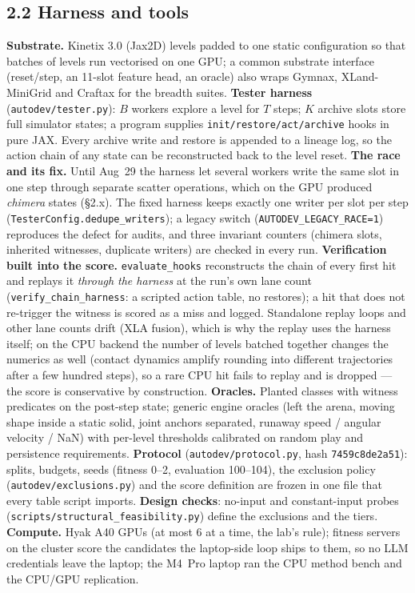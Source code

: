 \subsection*{2.2 Harness and tools}
\textbf{Substrate.} Kinetix 3.0 (Jax2D) levels padded to one static configuration so that batches of levels run vectorised on one GPU; a
common substrate interface (reset/step, an 11-slot feature head, an oracle) also wraps Gymnax, XLand-MiniGrid and Craftax for the breadth
suites. \textbf{Tester harness} (\texttt{autodev/tester.py}): $B$ workers explore a level for $T$ steps; $K$ archive slots store full simulator
states; a program supplies \texttt{init/restore/act/archive} hooks in pure JAX. Every archive write and restore is appended to a lineage log, so
the action chain of any state can be reconstructed back to the level reset. \textbf{The race and its fix.} Until Aug~29 the harness let several
workers write the same slot in one step through separate scatter operations, which on the GPU produced \emph{chimera} states (\S2.x). The fixed
harness keeps exactly one writer per slot per step (\texttt{TesterConfig.dedupe\_writers}); a legacy switch (\texttt{AUTODEV\_LEGACY\_RACE=1})
reproduces the defect for audits, and three invariant counters (chimera slots, inherited witnesses, duplicate writers) are checked in every run.
\textbf{Verification built into the score.} \texttt{evaluate\_hooks} reconstructs the chain of every first hit and replays it \emph{through the
harness} at the run's own lane count (\texttt{verify\_chain\_harness}: a scripted action table, no restores); a hit that does not re-trigger the
witness is scored as a miss and logged. Standalone replay loops and other lane counts drift (XLA fusion), which is why the replay uses the harness
itself; on the CPU backend the number of levels batched together changes the numerics as well (contact dynamics amplify rounding into different trajectories after a few hundred steps), so a rare CPU hit fails to replay and is dropped --- the score is conservative by construction. \textbf{Oracles.} Planted classes with witness predicates on the post-step state; generic engine oracles (left the arena, moving shape inside
a static solid, joint anchors separated, runaway speed / angular velocity / NaN) with per-level thresholds calibrated on random play and
persistence requirements. \textbf{Protocol} (\texttt{autodev/protocol.py}, hash \texttt{7459c8de2a51}): splits, budgets, seeds (fitness 0--2,
evaluation 100--104), the exclusion policy (\texttt{autodev/exclusions.py}) and the score definition are frozen in one file that every table
script imports. \textbf{Design checks}: no-input and constant-input probes (\texttt{scripts/structural\_feasibility.py}) define the exclusions and the
tiers. \textbf{Compute.} Hyak A40 GPUs (at most 6 at a time, the lab's rule); fitness servers on the cluster score the candidates the laptop-side
loop ships to them, so no LLM credentials leave the laptop; the M4~Pro laptop ran the CPU method bench and the CPU/GPU replication.

